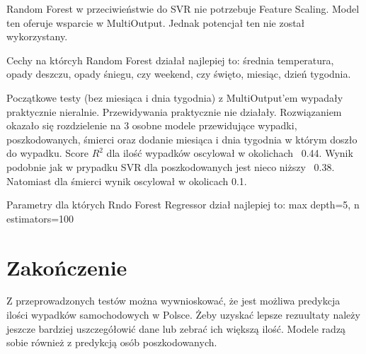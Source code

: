 \documentclass{article}
\begin{document}
Random Forest w przeciwieństwie do SVR nie potrzebuje Feature Scaling. Model ten oferuje wsparcie w  MultiOutput. Jednak potencjał ten nie został wykorzystany.

Cechy na którcyh Random Forest działał najlepiej to: średnia temperatura, opady deszczu, opady śniegu, czy weekend, czy święto, miesiąc, dzień tygodnia.

Początkowe testy (bez miesiąca i dnia tygodnia) z MultiOutput'em wypadały praktycznie nieralnie. Przewidywania praktycznie nie działały. 
Rozwiązaniem okazało się rozdzielenie na 3 osobne modele przewidujące wypadki, poszkodowanych, śmierci oraz dodanie miesiąca i dnia tygodnia w którym doszło do wypadku. 
Score \(R^2\) dla ilość wypadków oscylował w okolichach ~0.44. Wynik podobnie jak w prypadku SVR dla poszkodowanych jest nieco niższy ~0.38. 
Natomiast dla śmierci wynik oscylował w okolicach 0.1. 

Parametry dla których Rndo Forest Regressor dział najlepiej to: max depth=5, n estimators=100


\section{Zakończenie}

Z przeprowadzonych testów można wywnioskować, że jest możliwa predykcja ilości wypadków samochodowych w Polsce. Żeby uzyskać lepsze rezuultaty należy jeszcze bardziej uszczegółowić dane lub zebrać ich większą ilość. Modele radzą sobie również z predykcją osób poszkodowanych. 
\end{document}
